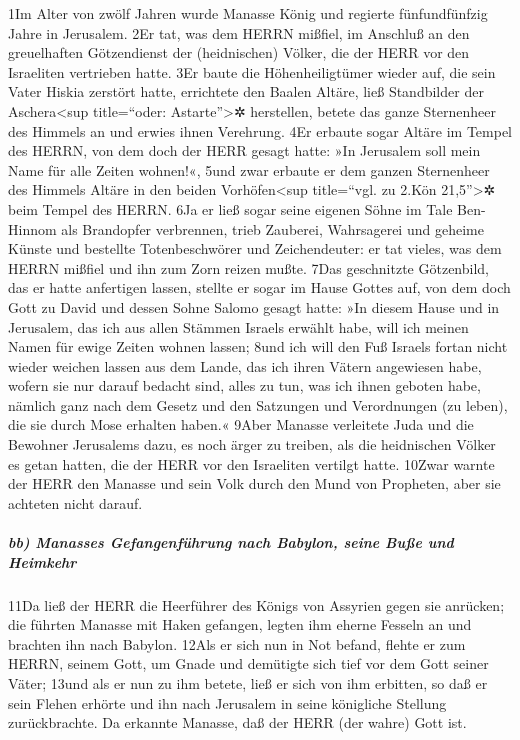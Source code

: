 1Im Alter von zwölf Jahren wurde Manasse König und regierte
fünfundfünfzig Jahre in Jerusalem. 2Er tat, was dem HERRN mißfiel, im
Anschluß an den greuelhaften Götzendienst der (heidnischen) Völker, die
der HERR vor den Israeliten vertrieben hatte. 3Er baute die
Höhenheiligtümer wieder auf, die sein Vater Hiskia zerstört hatte,
errichtete den Baalen Altäre, ließ Standbilder der Aschera\textless sup
title=``oder: Astarte''\textgreater✲ herstellen, betete das ganze
Sternenheer des Himmels an und erwies ihnen Verehrung. 4Er erbaute sogar
Altäre im Tempel des HERRN, von dem doch der HERR gesagt hatte: »In
Jerusalem soll mein Name für alle Zeiten wohnen!«, 5und zwar erbaute er
dem ganzen Sternenheer des Himmels Altäre in den beiden
Vorhöfen\textless sup title=``vgl. zu 2.Kön 21,5''\textgreater✲ beim
Tempel des HERRN. 6Ja er ließ sogar seine eigenen Söhne im Tale
Ben-Hinnom als Brandopfer verbrennen, trieb Zauberei, Wahrsagerei und
geheime Künste und bestellte Totenbeschwörer und Zeichendeuter: er tat
vieles, was dem HERRN mißfiel und ihn zum Zorn reizen mußte. 7Das
geschnitzte Götzenbild, das er hatte anfertigen lassen, stellte er sogar
im Hause Gottes auf, von dem doch Gott zu David und dessen Sohne Salomo
gesagt hatte: »In diesem Hause und in Jerusalem, das ich aus allen
Stämmen Israels erwählt habe, will ich meinen Namen für ewige Zeiten
wohnen lassen; 8und ich will den Fuß Israels fortan nicht wieder weichen
lassen aus dem Lande, das ich ihren Vätern angewiesen habe, wofern sie
nur darauf bedacht sind, alles zu tun, was ich ihnen geboten habe,
nämlich ganz nach dem Gesetz und den Satzungen und Verordnungen (zu
leben), die sie durch Mose erhalten haben.« 9Aber Manasse verleitete
Juda und die Bewohner Jerusalems dazu, es noch ärger zu treiben, als die
heidnischen Völker es getan hatten, die der HERR vor den Israeliten
vertilgt hatte. 10Zwar warnte der HERR den Manasse und sein Volk durch
den Mund von Propheten, aber sie achteten nicht darauf.

\hypertarget{bb-manasses-gefangenfuxfchrung-nach-babylon-seine-buuxdfe-und-heimkehr}{%
\subparagraph{bb) Manasses Gefangenführung nach Babylon, seine Buße und
Heimkehr}\label{bb-manasses-gefangenfuxfchrung-nach-babylon-seine-buuxdfe-und-heimkehr}}

11Da ließ der HERR die Heerführer des Königs von Assyrien gegen sie
anrücken; die führten Manasse mit Haken gefangen, legten ihm eherne
Fesseln an und brachten ihn nach Babylon. 12Als er sich nun in Not
befand, flehte er zum HERRN, seinem Gott, um Gnade und demütigte sich
tief vor dem Gott seiner Väter; 13und als er nun zu ihm betete, ließ er
sich von ihm erbitten, so daß er sein Flehen erhörte und ihn nach
Jerusalem in seine königliche Stellung zurückbrachte. Da erkannte
Manasse, daß der HERR (der wahre) Gott ist.

